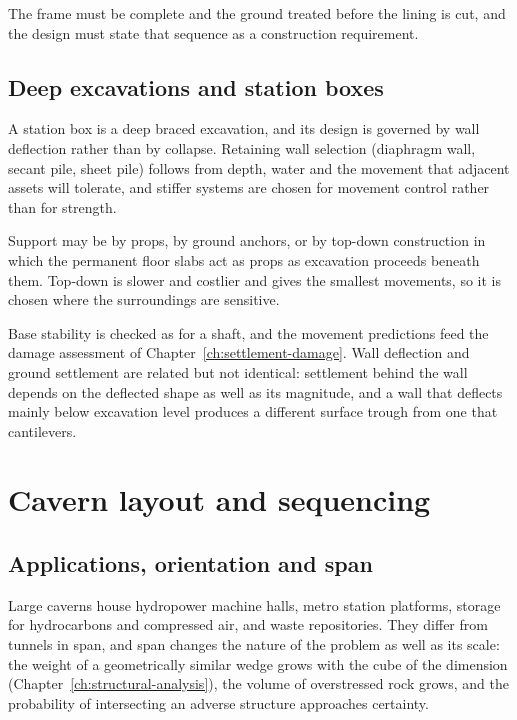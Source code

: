The frame must be complete and the ground treated before the
lining is cut, and the design must state that sequence as a construction
requirement.

\subsection{Deep excavations and station boxes}
\label{sec:station-boxes}

A station box is a deep braced excavation, and its design is governed by wall
deflection rather than by collapse. Retaining wall selection (diaphragm wall,
secant pile, sheet pile) follows from depth, water and the movement that
adjacent assets will tolerate, and stiffer systems are chosen for movement
control rather than for strength.

Support may be by props, by ground anchors, or by top-down construction in
which the permanent floor slabs act as props as excavation proceeds beneath
them. Top-down is slower and costlier and gives the smallest movements, so it
is chosen where the surroundings are sensitive.

Base stability is checked as for a shaft, and the movement predictions feed
the damage assessment of Chapter~\ref{ch:settlement-damage}. Wall deflection
and ground settlement are related but not identical: settlement behind the
wall depends on the deflected shape as well as its magnitude, and a wall that
deflects mainly below excavation level produces a different surface trough
from one that cantilevers.

\section{Cavern layout and sequencing}
\label{sec:cavern-layout}

\subsection{Applications, orientation and span}
\label{sec:cavern-applications-orientation}

Large caverns house hydropower machine halls, metro station platforms, storage
for hydrocarbons and compressed air, and waste repositories. They
differ from tunnels in span, and span changes the nature of the problem
as well as its scale: the weight of a geometrically
similar wedge grows with the cube of the dimension
(Chapter~\ref{ch:structural-analysis}), the volume of overstressed rock grows,
and the probability of intersecting an adverse structure approaches certainty.

